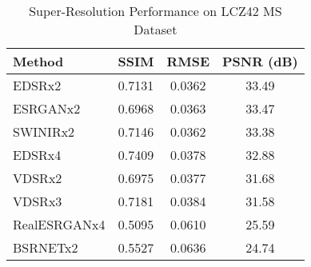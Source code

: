 \begin{table}[h]
\centering
\caption{Super-Resolution Performance on LCZ42 MS Dataset}
\label{tab:sr_results}
\begin{tabular}{lccc}
\toprule
Method & SSIM & RMSE & PSNR (dB) \\
\midrule
EDSRx2 & 0.7131 & 0.0362 & 33.49 \\
ESRGANx2 & 0.6968 & 0.0363 & 33.47 \\
SWINIRx2 & 0.7146 & 0.0362 & 33.38 \\
EDSRx4 & 0.7409 & 0.0378 & 32.88 \\
VDSRx2 & 0.6975 & 0.0377 & 31.68 \\
VDSRx3 & 0.7181 & 0.0384 & 31.58 \\
RealESRGANx4 & 0.5095 & 0.0610 & 25.59 \\
BSRNETx2 & 0.5527 & 0.0636 & 24.74 \\
\bottomrule
\end{tabular}
\end{table}
